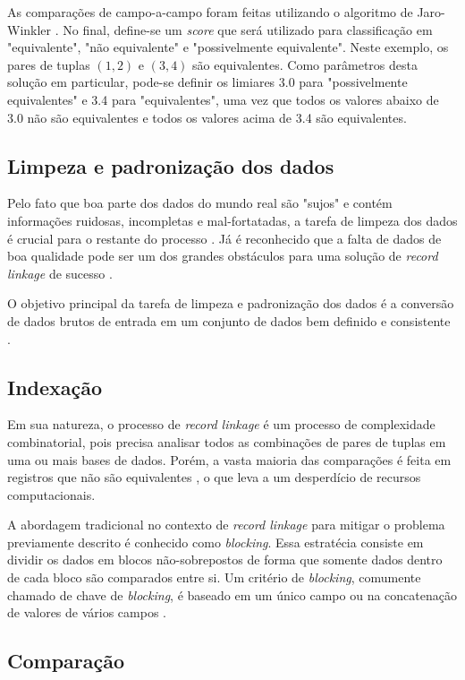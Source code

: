 \documentclass[
	12pt,				%
	openany,			%
	twoside,			%
	a4paper,			%
	brazil,				%
	]{unimontes-ppgmsc-abntex2}
\begin{document}
As comparações de campo-a-campo foram feitas utilizando o algoritmo de Jaro-Winkler \cite{jaro}. No final, define-se um \textit{score} que será utilizado para classificação em "equivalente", "não equivalente" e "possivelmente equivalente". Neste exemplo, os pares de tuplas $(1,2)$ e $(3,4)$ são equivalentes. Como parâmetros desta solução em particular, pode-se definir os limiares 3.0 para "possivelmente equivalentes" e 3.4 para "equivalentes", uma vez que todos os valores abaixo de 3.0 não são equivalentes e todos os valores acima de 3.4 são equivalentes.

\subsection{Limpeza e padronização dos dados}

Pelo fato que boa parte dos dados do mundo real são "sujos" e contém informações ruidosas, incompletas e mal-fortatadas, a tarefa de limpeza dos dados é crucial para o restante do processo \cite{churches}. Já é reconhecido que a falta de dados de boa qualidade pode ser um dos grandes obstáculos para uma solução de \textit{record linkage} de sucesso \cite{clark}.

O objetivo principal da tarefa de limpeza e padronização dos dados é a conversão de dados brutos de entrada em um conjunto de dados bem definido e consistente \cite{churches}.

\subsection{Indexação}

Em sua natureza, o processo de \textit{record linkage} é um processo de complexidade combinatorial, pois precisa analisar todos as combinações de pares de tuplas em uma ou mais bases de dados. Porém, a vasta maioria das comparações é feita em registros que não são equivalentes \cite{survey}, o que leva a um desperdício de recursos computacionais.

A abordagem tradicional no contexto de \textit{record linkage} para mitigar o problema previamente descrito é conhecido como \textit{blocking}. Essa estratécia consiste em dividir os dados em blocos não-sobrepostos de forma que somente dados dentro de cada bloco são comparados entre si. Um critério de \textit{blocking}, comumente chamado de chave de \textit{blocking}, é baseado em um único campo ou na concatenação de valores de vários campos \cite{survey}.

\subsection{Comparação}
\end{document}
